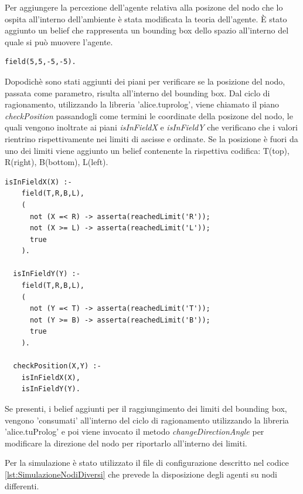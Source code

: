 \documentclass[12pt,a4paper,openright,twoside]{report}
\begin{document}
Per aggiungere la percezione dell'agente relativa alla posizone del nodo che lo ospita all'interno dell'ambiente \`e stata modificata la teoria dell'agente. \`E stato aggiunto un belief che rappresenta un bounding box dello spazio all'interno del quale si pu\`o muovere l'agente.
\medskip
\begin{lstlisting}[firstnumber=1,caption={Bounding-box}]
  field(5,5,-5,-5).
\end{lstlisting}
Dopodich\`e sono stati aggiunti dei piani per verificare se la posizione del nodo, passata come parametro, risulta all'interno del bounding box. Dal ciclo di ragionamento, utilizzando la libreria 'alice.tuprolog', viene chiamato il piano \textit{checkPosition} passandogli come termini le coordinate della posizone del nodo, le quali vengono inoltrate ai piani \textit{isInFieldX} e \textit{isInFieldY} che verificano che i valori rientrino rispettivamente nei limiti di ascisse e ordinate. Se la posizione \`e fuori da uno dei limiti viene aggiunto un belief contenente la rispettiva codifica: T(top), R(right), B(bottom), L(left).
\medskip
\begin{lstlisting}[firstnumber=18,caption={Piani per la gestione del bounding-box}]
  isInFieldX(X) :-
    field(T,R,B,L),
    (
      not (X =< R) -> asserta(reachedLimit('R'));
      not (X >= L) -> asserta(reachedLimit('L'));
      true
    ).

  isInFieldY(Y) :-
    field(T,R,B,L),
    (
      not (Y =< T) -> asserta(reachedLimit('T'));
      not (Y >= B) -> asserta(reachedLimit('B'));
      true
    ).

  checkPosition(X,Y) :-
    isInFieldX(X),
    isInFieldY(Y).
\end{lstlisting}
Se presenti, i belief aggiunti per il raggiungimento dei limiti del bounding box, vengono 'consumati' all'interno del ciclo di ragionamento utilizzando la libreria 'alice.tuProlog' e poi viene invocato il metodo \textit{changeDirectionAngle} per modificare la direzione del nodo per riportarlo all'interno dei limiti.

\bigskip

Per la simulazione \`e stato utilizzato il file di configurazione descritto nel codice \ref{lst:SimulazioneNodiDiversi} che prevede la disposizione degli agenti su nodi differenti.



\end{document}
